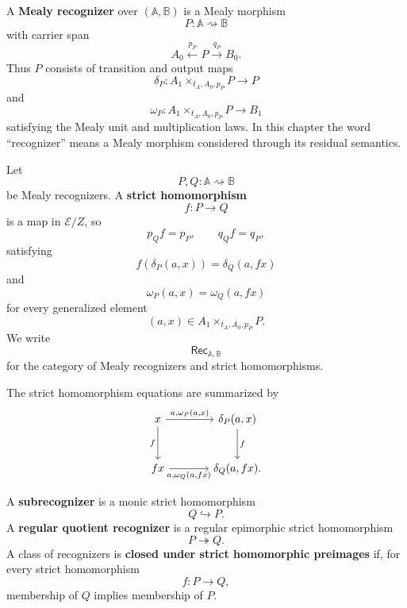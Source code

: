 \begin{definition}
\label{def:mealy-recognizer}
    A \textbf{Mealy recognizer} over \((\mathbb A,\mathbb B)\) is a Mealy
    morphism
    \[
        P:\mathbb A\rightsquigarrow\mathbb B
    \]
    with carrier span
    \[
        A_0\xleftarrow{p_P}P\xrightarrow{q_P}B_0.
    \]
    Thus \(P\) consists of transition and output maps
    \[
        \delta_P:
        A_1\times_{t_A,A_0,p_P}P\to P
    \]
    and
    \[
        \omega_P:
        A_1\times_{t_A,A_0,p_P}P\to B_1
    \]
    satisfying the Mealy unit and multiplication laws. In this chapter the word
    ``recognizer'' means a Mealy morphism considered through its residual
    semantics.
\end{definition}

\begin{definition}
\label{def:strict-homomorphism}
    Let
    \[
        P,Q:\mathbb A\rightsquigarrow\mathbb B
    \]
    be Mealy recognizers. A \textbf{strict homomorphism}
    \[
        f:P\to Q
    \]
    is a map in \(\mathcal E/Z\), so
    \[
        p_Qf=p_P,
        \qquad
        q_Qf=q_P,
    \]
    satisfying
    \[
        f(\delta_P(a,x))=\delta_Q(a,fx)
    \]
    and
    \[
        \omega_P(a,x)=\omega_Q(a,fx)
    \]
    for every generalized element
    \[
        (a,x)\in A_1\times_{t_A,A_0,p_P}P.
    \]
    We write
    \[
        \mathsf{Rec}_{\mathbb A,\mathbb B}
    \]
    for the category of Mealy recognizers and strict homomorphisms.
\end{definition}

The strict homomorphism equations are summarized by
\[
\begin{tikzcd}[column sep=large, row sep=large]
    x
        \arrow[r, "{a,\omega_P(a,x)}"]
        \arrow[d, "f"']
    &
    \delta_P(a,x)
        \arrow[d, "f"]
    \\
    fx
        \arrow[r, "{a,\omega_Q(a,fx)}"']
    &
    \delta_Q(a,fx).
\end{tikzcd}
\]

\begin{definition}
\label{def:sub-and-quotient-recognizer}
    A \textbf{subrecognizer} is a monic strict homomorphism
    \[
        Q\hookrightarrow P.
    \]
    A \textbf{regular quotient recognizer} is a regular epimorphic strict
    homomorphism
    \[
        P\twoheadrightarrow Q.
    \]
    A class of recognizers is \textbf{closed under strict homomorphic
    preimages} if, for every strict homomorphism
    \[
        f:P\to Q,
    \]
    membership of \(Q\) implies membership of \(P\).
\end{definition}

